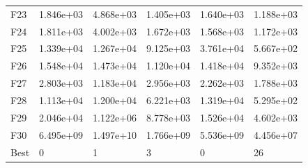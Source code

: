 \begin{tabular}{llllll}
F23  &  1.846e+03 &  4.868e+03 &  1.405e+03 &  1.640e+03 &  1.188e+03 \\
F24  &  1.811e+03 &  4.002e+03 &  1.672e+03 &  1.568e+03 &  1.172e+03 \\
F25  &  1.339e+04 &  1.267e+04 &  9.125e+03 &  3.761e+04 &  5.667e+02 \\
F26  &  1.548e+04 &  1.473e+04 &  1.120e+04 &  1.418e+04 &  9.352e+03 \\
F27  &  2.803e+03 &  1.183e+04 &  2.956e+03 &  2.262e+03 &  1.788e+03 \\
F28  &  1.113e+04 &  1.200e+04 &  6.221e+03 &  1.319e+04 &  5.295e+02 \\
F29  &  2.046e+04 &  1.122e+06 &  8.778e+03 &  1.526e+04 &  4.602e+03 \\
F30  &  6.495e+09 &  1.497e+10 &  1.766e+09 &  5.536e+09 &  4.456e+07 \\
Best &          0 &          1 &          3 &          0 &         26 \\
\bottomrule
\end{tabular}
